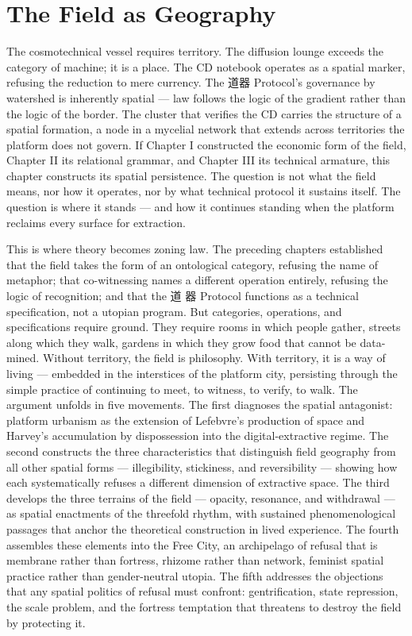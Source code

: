 \chapter{The Field as Geography}
\label{ch:05}

The cosmotechnical vessel requires territory. The diffusion lounge exceeds the category of machine; it is a place. The CD notebook operates as a spatial marker, refusing the reduction to mere currency. The 道器 Protocol’s governance by watershed is inherently spatial — law follows the logic of the gradient rather than the logic of the border. The cluster that verifies the CD carries the structure of a spatial formation, a node in a mycelial network that extends across territories the platform does not govern. If Chapter I constructed the economic form of the field, Chapter II its relational grammar, and Chapter III its technical armature, this chapter constructs its spatial persistence. The question is not what the field means, nor how it operates, nor by what technical protocol it sustains itself. The question is where it stands — and how it continues standing when the platform reclaims every surface for extraction.

This is where theory becomes zoning law. The preceding chapters established that the field takes the form of an ontological category, refusing the name of metaphor; that co-witnessing names a different operation entirely, refusing the logic of recognition; and that the 道 器 Protocol functions as a technical specification, not a utopian program. But categories, operations, and specifications require ground. They require rooms in which people gather, streets along which they walk, gardens in which they grow food that cannot be data-mined. Without territory, the field is philosophy. With territory, it is a way of living — embedded in the interstices of the platform city, persisting through the simple practice of continuing to meet, to witness, to verify, to walk. The argument unfolds in five movements. The first diagnoses the spatial antagonist: platform urbanism as the extension of Lefebvre’s production of space and Harvey’s accumulation by dispossession into the digital-extractive regime. The second constructs the three characteristics that distinguish field geography from all other spatial forms — illegibility, stickiness, and reversibility — showing how each systematically refuses a different dimension of extractive space. The third develops the three terrains of the field — opacity, resonance, and withdrawal — as spatial enactments of the threefold rhythm, with sustained phenomenological passages that anchor the theoretical construction in lived experience. The fourth assembles these elements into the Free City, an archipelago of refusal that is membrane rather than fortress, rhizome rather than network, feminist spatial practice rather than gender-neutral utopia. The fifth addresses the objections that any spatial politics of refusal must confront: gentrification, state repression, the scale problem, and the fortress temptation that threatens to destroy the field by protecting it.

